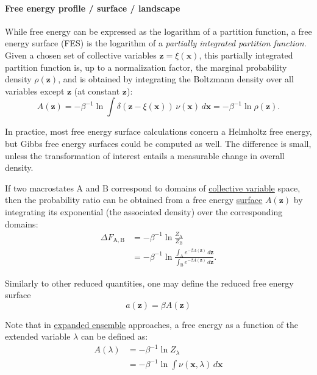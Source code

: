 \documentclass[9pt,review]{livecoms}
\newcommand{\vx}{\mathbf{x}}
\newcommand{\vz}{\mathbf{z}}
\newcommand{\A}{\mathrm{A}}
\newcommand{\B}{\mathrm{B}}
\begin{document}
\hypertarget{ref:FES} {\paragraph{Free energy profile / surface / landscape}}
\label{sec:FES}
While free energy can be expressed as the logarithm of a partition function, a free energy surface (FES) is the logarithm of a \textit{partially integrated partition function}.
Given a chosen set of collective variables $\vz = \xi(\vx)$, this partially integrated partition function is, up to a normalization factor, the marginal probability density $\rho(\vz)$, and is obtained by integrating the Boltzmann density over all variables except $\vz$ (at constant $\vz$):
\begin{equation}
\label{eq:fes_definition}
    A(\vz) = -\beta^{-1} \ln \int
    \delta\left(\vz-\xi(\vx)\right) \, \nu(\vx)\, d\vx
    = -\beta^{-1} \ln \rho(\vz) .
\end{equation}

In practice, most free energy surface calculations concern a Helmholtz free energy, but Gibbs free energy surfaces could be computed as well. The difference is small, unless the transformation of interest entails a measurable change in overall density.

If two macrostates $\A$ and $\B$ correspond to domains of \hyperlink{ref:CV} {collective variable} space, then the probability ratio can be obtained from a free energy \hyperlink{ref:FES} {surface} $A(\vz)$ by integrating its exponential (the associated density) over the corresponding domains:
\begin{align}
  \Delta F_{\A,\B} &=
  -\beta^{-1} \ln \frac{Z_\A}{Z_\B}\\
  & =  -\beta^{-1} \ln
  \frac{\int_\A e^{-\beta A(\vz)} \, d\vz}
  {\int_\B e^{-\beta A(\vz)} \, d\vz}.
\end{align}

Similarly to other reduced quantities, one may define the reduced free energy surface
\begin{equation}
    a(\vz) = \beta A(\vz)
\end{equation}

Note that in \hyperlink{ref:ExpEns} {expanded ensemble} approaches, a free energy as a function of the extended variable $\lambda$ can be defined as:
\begin{align}
    A(\lambda) &= -\beta^{-1} \ln Z_\lambda
    \nonumber \\
    &= -\beta^{-1} \ln \int
    \nu(\vx, \lambda)\, d\vx
\end{align}
\end{document}
